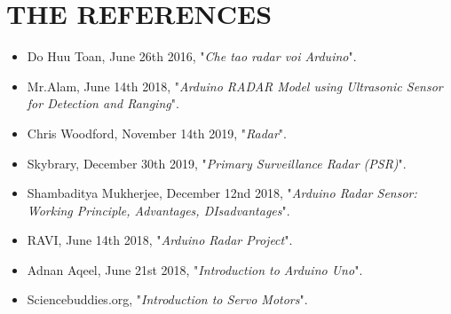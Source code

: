 \documentclass[13pt,a4paper]{report}
\begin{document}
    \chapter{THE REFERENCES}
        \begin{itemize}
            \item Do Huu Toan, June 26th 2016, "\textit{Che tao radar voi Arduino}".
            \item Mr.Alam, June 14th 2018, "\textit{Arduino RADAR Model using Ultrasonic Sensor for Detection and Ranging}".
            \item Chris Woodford, November 14th 2019, "\textit{Radar}".
            \item Skybrary, December 30th 2019, "\textit{Primary Surveillance Radar (PSR)}".
            \item Shambaditya Mukherjee, December 12nd 2018, "\textit{Arduino Radar Sensor: Working Principle, Advantages, DIsadvantages}".
            \item RAVI, June 14th 2018, "\textit{Arduino Radar Project}".
            \item Adnan Aqeel, June 21st 2018, "\textit{Introduction to Arduino Uno}".
            \item Sciencebuddies.org, "\textit{Introduction to Servo Motors}".
        \end{itemize}
\end{document}
